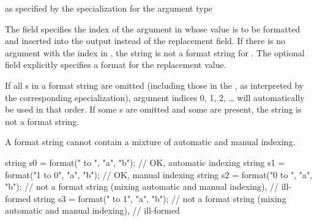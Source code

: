 \begin{ncbnf}
\br
    \textnormal{as specified by the  specialization for the argument type}
\end{ncbnf}

\pnum
The  field specifies the index of
the argument in 
whose value is to be formatted and inserted into the output
instead of the replacement field.
If there is no argument with
the index  in ,
the string is not a format string for .
The optional  field
explicitly specifies a format for the replacement value.

\pnum
\begin{example}
\begin{codeblock}
string s = format("{0}-{{", 8);         // value of  is 
\end{codeblock}
\end{example}

\pnum
If all s in a format string are omitted
(including those in the ,
as interpreted by the corresponding  specialization),
argument indices 0, 1, 2, \ldots{} will automatically be used in that order.
If some s are omitted and some are present,
the string is not a format string.
\begin{note}
A format string cannot contain a
mixture of automatic and manual indexing.
\end{note}
\begin{example}
\begin{codeblock}
string s0 = format("{} to {}",   "a", "b"); // OK, automatic indexing
string s1 = format("{1} to {0}", "a", "b"); // OK, manual indexing
string s2 = format("{0} to {}",  "a", "b"); // not a format string (mixing automatic and manual indexing),
                                            // ill-formed
string s3 = format("{} to {1}",  "a", "b"); // not a format string (mixing automatic and manual indexing),
                                            // ill-formed
\end{codeblock}
\end{example}

